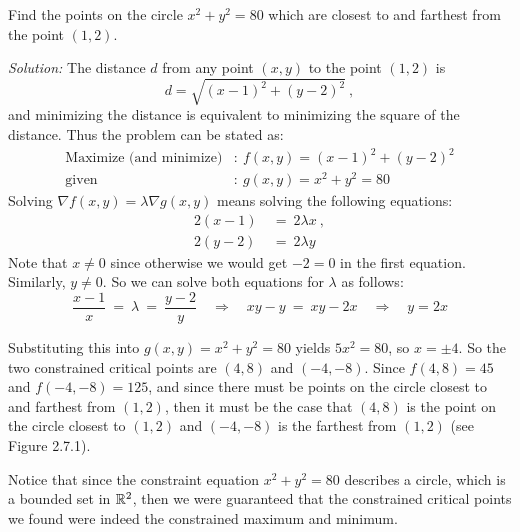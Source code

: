 \begin{exmp}
 Find the points on the circle $x^2 + y^2 = 80$ which are closest to and farthest from the point $(1,2)$.\vspace{1mm}
 \par\noindent \emph{Solution:} The distance $d$ from any point $(x,y)$ to the point $(1,2)$ is
 \begin{displaymath}
  d = \sqrt{(x-1)^2 + (y-2)^2} ~,
 \end{displaymath}
 and minimizing the distance is equivalent to minimizing the square of the distance. Thus the problem can be stated as:
 \begin{align*}
  \text{Maximize (and minimize)}&: ~ f(x,y) = (x-1)^2 + (y-2)^2\\
  \text{given}&: ~ g(x,y) = x^2 + y^2 = 80
 \end{align*}
 Solving $\nabla f(x,y) = \lambda \nabla g(x,y)$ means solving the following equations:
 \begin{align*}
  2(x-1) ~&=~ 2\lambda x ~,\\
  2(y-2) ~&=~ 2\lambda y
 \end{align*}
 Note that $x \ne 0$ since otherwise we would get $-2=0$ in the first equation. Similarly, $y \ne 0$.
 So we can solve both equations for $\lambda$ as follows:
 \begin{displaymath}
  \frac{x-1}{x} ~=~ \lambda ~=~ \frac{y-2}{y} \quad \Rightarrow \quad xy-y ~= ~xy-2x \quad \Rightarrow \quad y=2x
 \end{displaymath}

 \piccaption[]{}
 Substituting this into $g(x,y) = x^2 + y^2 = 80$ yields $5x^2=80$, so $x=\pm 4$. So the two constrained critical
 points are $(4,8)$ and $(-4,-8)$. Since $f(4,8)=45$ and $f(-4,-8)=125$, and since there must be points on the circle
 closest to and farthest from $(1,2)$, then it must be the case that $(4,8)$ is the point on the circle
 closest to $(1,2)$ and $(-4,-8)$ is the farthest from $(1,2)$ (see Figure 2.7.1).
 
 Notice that since the constraint equation $x^2 + y^2 = 80$ describes a circle, which is a bounded set in $\mathbb{R}^{2}$,
 then we were guaranteed that the constrained critical points we found were indeed the constrained maximum and
 minimum.
\end{exmp}
